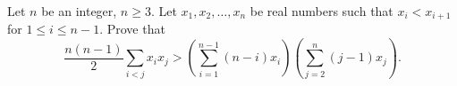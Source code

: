 Let $n$ be an integer, $n \geq 3$. Let $x_1, x_2, \ldots, x_n$ be real numbers such that $x_i < x_{i+1}$ for $1 \leq i \leq n - 1$. Prove that
\[ \frac{n(n-1)}{2} \sum_{i<j} x_i x_j > \left(\sum_{i=1}^{n-1} (n-i) x_i\right) \left(\sum_{j=2}^{n} (j-1) x_j\right). \]
